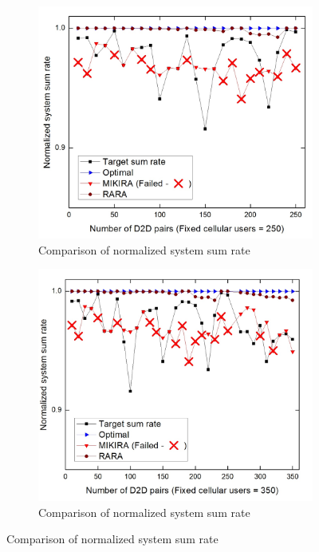 \documentclass{ieeeaccess}
\begin{document}
\begin{figure}
\begin{multicols}{2}
\begin{subfigure}{.86\linewidth}
 	\includegraphics[width=\linewidth]{Graph/sumrate_rara.jpg}\par
	\caption{Comparison of normalized system sum rate}
	\label{fig:sumrate_res}
	\end{subfigure}
	
	\hspace{12pt}
	\begin{subfigure}{.86\linewidth}
  	\includegraphics[width=\linewidth]{Graph/sum_rara_350.jpg}\par
	\caption{Comparison of normalized system sum rate}
	\label{fig:sumrate_res_350}
	\end{subfigure}
	\end{multicols}


\end{figure}
\end{document}

